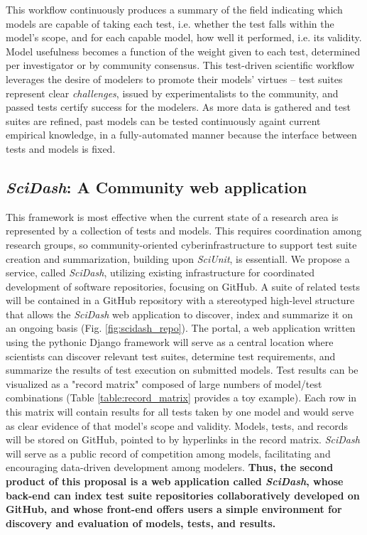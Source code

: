 \documentclass[11pt,letterpaper]{article}
\begin{document}
This workflow continuously produces a summary of the field indicating which models are capable of taking each test, i.e. whether the test falls within the model's scope, and for each capable model, how well it performed, i.e. its validity.  Model usefulness becomes a function of the weight given to each test, determined per investigator or by community consensus. This test-driven scientific workflow leverages the desire of modelers to promote their models' virtues -- test suites represent clear \emph{challenges}, issued by experimentalists to the community, and passed tests certify success for the modelers. As more data is gathered and test suites are refined, past models can be tested continuously againt current empirical knowledge, in a fully-automated manner because the interface between tests and models is fixed.  

\subsection{\textit{SciDash}: A Community web application}\label{sec:scidash}
This framework is most effective when the current state of a research area is represented by a collection of tests and models. This requires coordination among research groups, so community-oriented cyberinfrastructure to support test suite creation and summarization, building upon \textit{SciUnit}, is essentiall. We propose a service, called \textit{SciDash}, utilizing existing infrastructure for coordinated development of software repositories, focusing on GitHub\cite{github_url}\cite{ram_git_2013}. A suite of related tests will be contained in a GitHub repository with a stereotyped high-level structure that allows the \textit{SciDash} web application to discover, index and summarize it on an ongoing basis (Fig. \ref{fig:scidash_repo}). The portal, a web application written using the pythonic Django framework\cite{django_url} will serve as a central location where scientists can discover relevant test suites, determine test requirements, and summarize the results of test execution on submitted models. Test results can be visualized as a "record matrix" composed of large numbers of model/test combinations (Table \ref{table:record_matrix} provides a toy example).  Each row in this matrix will contain results for all tests taken by one model and would serve as clear evidence of that model's scope and validity.  Models, tests, and records will be stored on GitHub, pointed to by hyperlinks in the record matrix. \textit{SciDash} will serve as a public record of competition among models, facilitating and encouraging data-driven development among modelers. \textbf{Thus, the second product of this proposal is a web application called \textit{SciDash}, whose back-end can index test suite repositories collaboratively developed on GitHub, and whose front-end offers users a simple environment for discovery and evaluation of models, tests, and results.}  
\end{document}
